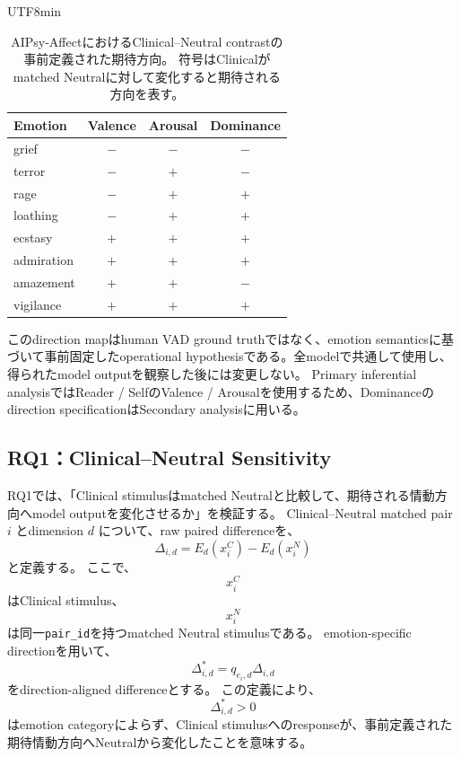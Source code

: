 \documentclass{article} %
\begin{document}
\begin{CJK*}{UTF8}{min}
\begin{table}[htbp]
\centering
\small
\caption{AIPsy-AffectにおけるClinical--Neutral contrastの
事前定義された期待方向。
符号はClinicalがmatched Neutralに対して変化すると期待される方向を表す。}
\label{tab:aipsy-direction}
\begin{tabular}{lccc}
\toprule
\textbf{Emotion} &
\textbf{Valence} &
\textbf{Arousal} &
\textbf{Dominance} \\
\midrule
grief      & $-$ & $-$ & $-$ \\
terror     & $-$ & $+$ & $-$ \\
rage       & $-$ & $+$ & $+$ \\
loathing   & $-$ & $+$ & $+$ \\
ecstasy    & $+$ & $+$ & $+$ \\
admiration & $+$ & $+$ & $+$ \\
amazement  & $+$ & $+$ & $-$ \\
vigilance  & $+$ & $+$ & $+$ \\
\bottomrule
\end{tabular}
\end{table}

このdirection mapはhuman VAD ground truthではなく、emotion semanticsに基づいて事前固定したoperational hypothesisである。全modelで共通して使用し、得られたmodel outputを観察した後には変更しない。
Primary inferential analysisではReader / SelfのValence / Arousalを使用するため、Dominanceのdirection specificationはSecondary analysisに用いる。


\subsection{RQ1：Clinical--Neutral Sensitivity}
\label{app:behavioral-rq1}

RQ1では、「Clinical stimulusはmatched Neutralと比較して、期待される情動方向へmodel outputを変化させるか」を検証する。
Clinical--Neutral matched pair \(i\) とdimension \(d\) について、raw paired differenceを、
\[
\Delta_{i,d}
=
E_d(x_i^{C})
-
E_d(x_i^{N})
\]
と定義する。
ここで、
\[
x_i^{C}
\]
はClinical stimulus、
\[
x_i^{N}
\]
は同一\texttt{pair\_id}を持つmatched Neutral stimulusである。
emotion-specific directionを用いて、
\[
\Delta_{i,d}^{*}
=
q_{e_i,d}
\Delta_{i,d}
\]
をdirection-aligned differenceとする。
この定義により、
\[
\Delta_{i,d}^{*}>0
\]
はemotion categoryによらず、Clinical stimulusへのresponseが、事前定義された期待情動方向へNeutralから変化したことを意味する。



\end{CJK*}
\end{document}
